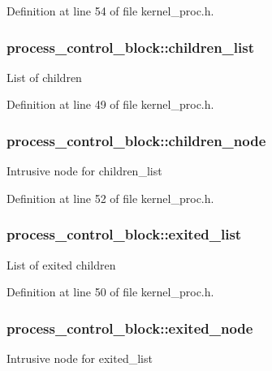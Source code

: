 Definition at line 54 of file kernel\-\_\-proc.\-h.

\hypertarget{structprocess__control__block_a79b0dd70bbfff1d7da6ab4cbbd00eb1f}{
\subsubsection[{children\-\_\-list}]{ process\-\_\-control\-\_\-block\-::children\-\_\-list}}\label{structprocess__control__block_a79b0dd70bbfff1d7da6ab4cbbd00eb1f}
List of children 

Definition at line 49 of file kernel\-\_\-proc.\-h.

\hypertarget{structprocess__control__block_a5b9aeabcc3d676cda39eb563a4cc5bd9}{
\subsubsection[{children\-\_\-node}]{ process\-\_\-control\-\_\-block\-::children\-\_\-node}}\label{structprocess__control__block_a5b9aeabcc3d676cda39eb563a4cc5bd9}
Intrusive node for {\ttfamily children\-\_\-list} 

Definition at line 52 of file kernel\-\_\-proc.\-h.

\hypertarget{structprocess__control__block_afddb936103b136214462e1ed870c4c70}{
\subsubsection[{exited\-\_\-list}]{ process\-\_\-control\-\_\-block\-::exited\-\_\-list}}\label{structprocess__control__block_afddb936103b136214462e1ed870c4c70}
List of exited children 

Definition at line 50 of file kernel\-\_\-proc.\-h.

\hypertarget{structprocess__control__block_a9e0d93783a89bd92f39243353f04a27e}{
\subsubsection[{exited\-\_\-node}]{ process\-\_\-control\-\_\-block\-::exited\-\_\-node}}\label{structprocess__control__block_a9e0d93783a89bd92f39243353f04a27e}
Intrusive node for {\ttfamily exited\-\_\-list} 

